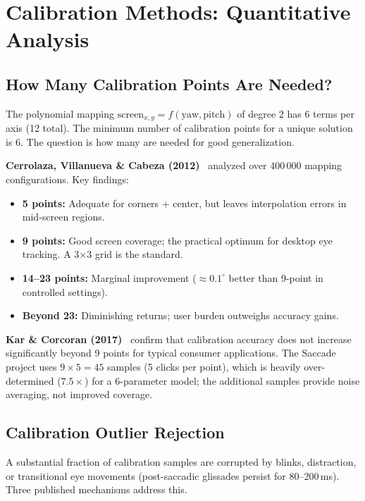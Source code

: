 \documentclass[11pt,a4paper]{article}
\begin{document}
\section{Calibration Methods: Quantitative Analysis}
\label{sec:calibration}

\subsection{How Many Calibration Points Are Needed?}

The polynomial mapping $\text{screen}_{x,y} = f(\text{yaw}, \text{pitch})$ of degree 2 has 6 terms per axis (12 total).
The minimum number of calibration points for a unique solution is 6.
The question is how many are needed for good generalization.

\textbf{Cerrolaza, Villanueva \& Cabeza (2012)}~\cite{cerrolaza2012polynomial} analyzed over 400\,000 mapping configurations.
Key findings:
\begin{itemize}
  \item \textbf{5 points:} Adequate for corners + center, but leaves interpolation errors in mid-screen regions.
  \item \textbf{9 points:} Good screen coverage; the practical optimum for desktop eye tracking. A 3×3 grid is the standard.
  \item \textbf{14--23 points:} Marginal improvement ($\approx0.1^\circ$ better than 9-point in controlled settings).
  \item \textbf{Beyond 23:} Diminishing returns; user burden outweighs accuracy gains.
\end{itemize}

\textbf{Kar \& Corcoran (2017)}~\cite{kar2017review} confirm that calibration accuracy does not increase significantly beyond 9 points for typical consumer applications.
The Saccade project uses $9 \times 5 = 45$ samples (5 clicks per point), which is heavily over-determined ($7.5\times$) for a 6-parameter model; the additional samples provide noise averaging, not improved coverage.

\subsection{Calibration Outlier Rejection}
\label{subsec:outlier}

A substantial fraction of calibration samples are corrupted by blinks, distraction,
or transitional eye movements (post-saccadic glissades persist for 80--200\,ms).
Three published mechanisms address this.
\end{document}
